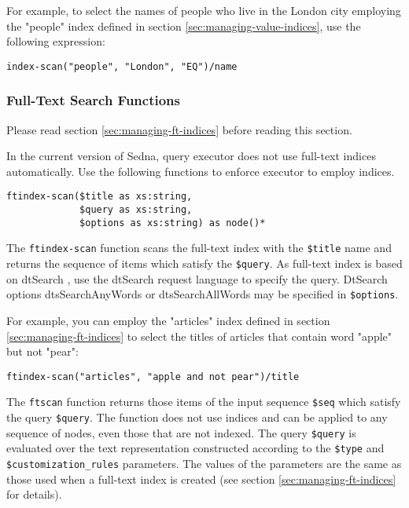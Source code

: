 \documentclass[a4paper,12pt]{article}
\begin{document}
For example, to select the names of people who live in the London city employing
the "people" index defined in section \ref{sec:managing-value-indices}, use the
following expression:

\begin{verbatim}
index-scan("people", "London", "EQ")/name
\end{verbatim}


\subsubsection{Full-Text Search Functions}
\label{sec:ft-fun}

Please read section \ref{sec:managing-ft-indices} before reading this section.

In the current version of Sedna, query executor does not use full-text indices
automatically. Use the following functions to enforce executor to employ
indices.

\begin{verbatim}
ftindex-scan($title as xs:string,
             $query as xs:string,
             $options as xs:string) as node()*
\end{verbatim}

The \verb!ftindex-scan! function scans the full-text index with the
\verb!$title! name and returns the sequence of items which satisfy the
\verb!$query!. As full-text index is based on dtSearch
\cite{link:dtsearch-engine}, use the dtSearch request language
\cite{doc:dtsearch} to specify the query. DtSearch options dtsSearchAnyWords or
dtsSearchAllWords may be specified in \verb!$options!.

For example, you can employ the "articles" index defined in section
\ref{sec:managing-ft-indices} to select the titles of articles that contain word
"apple" but not "pear":

\begin{verbatim}
ftindex-scan("articles", "apple and not pear")/title
\end{verbatim}

The \verb!ftscan! function returns those items of the input sequence \verb!$seq!
which satisfy the query \verb!$query!. The function does not use indices and can
be applied to any sequence of nodes, even those that are not indexed. The query
\verb!$query! is evaluated over the text representation constructed according to
the \verb!$type! and \verb!$customization_rules! parameters. The values of the
parameters are the same as those used when a full-text index is created (see
section \ref{sec:managing-ft-indices} for details).
\end{document}
